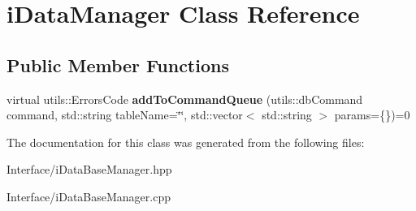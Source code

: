 \hypertarget{classi_data_manager}{}\section{i\+Data\+Manager Class Reference}
\label{classi_data_manager}
\subsection*{Public Member Functions}
\begin{DoxyCompactItemize}
\item 
\mbox{\label{classi_data_manager_a6547f286e5f563b39222b3b129b357a4}} 
virtual utils\+::\+Errors\+Code {\bfseries add\+To\+Command\+Queue} (utils\+::db\+Command command, std\+::string table\+Name=\char`\"{}\char`\"{}, std\+::vector$<$ std\+::string $>$ params=\{\})=0
\end{DoxyCompactItemize}


The documentation for this class was generated from the following files\+:\begin{DoxyCompactItemize}
\item 
Interface/i\+Data\+Base\+Manager.\+hpp\item 
Interface/i\+Data\+Base\+Manager.\+cpp\end{DoxyCompactItemize}
